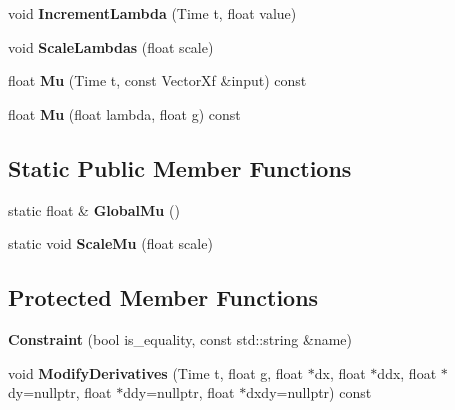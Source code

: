 \begin{DoxyCompactItemize}
\item 
void {\bfseries Increment\+Lambda} (Time t, float value)\hypertarget{classilqgames_1_1_constraint_a41450a7d296c8e31857e44d056e1b9ab}{}\label{classilqgames_1_1_constraint_a41450a7d296c8e31857e44d056e1b9ab}

\item 
void {\bfseries Scale\+Lambdas} (float scale)\hypertarget{classilqgames_1_1_constraint_a8b708fd62f64cd72828d0536d9ad7671}{}\label{classilqgames_1_1_constraint_a8b708fd62f64cd72828d0536d9ad7671}

\item 
float {\bfseries Mu} (Time t, const Vector\+Xf \&input) const \hypertarget{classilqgames_1_1_constraint_a703d0ccdeb1157adc9a681bf7857b9dc}{}\label{classilqgames_1_1_constraint_a703d0ccdeb1157adc9a681bf7857b9dc}

\item 
float {\bfseries Mu} (float lambda, float g) const \hypertarget{classilqgames_1_1_constraint_a6280ae8452b7ff990843d81bed470016}{}\label{classilqgames_1_1_constraint_a6280ae8452b7ff990843d81bed470016}

\end{DoxyCompactItemize}
\subsection*{Static Public Member Functions}
\begin{DoxyCompactItemize}
\item 
static float \& {\bfseries Global\+Mu} ()\hypertarget{classilqgames_1_1_constraint_ab8d5b4e624d92938469cf219ea42293d}{}\label{classilqgames_1_1_constraint_ab8d5b4e624d92938469cf219ea42293d}

\item 
static void {\bfseries Scale\+Mu} (float scale)\hypertarget{classilqgames_1_1_constraint_a131ca1c98e53240d06dcf9e405d8c885}{}\label{classilqgames_1_1_constraint_a131ca1c98e53240d06dcf9e405d8c885}

\end{DoxyCompactItemize}
\subsection*{Protected Member Functions}
\begin{DoxyCompactItemize}
\item 
{\bfseries Constraint} (bool is\+\_\+equality, const std\+::string \&name)\hypertarget{classilqgames_1_1_constraint_acf86b4a9aab163591e785f90b3263fe3}{}\label{classilqgames_1_1_constraint_acf86b4a9aab163591e785f90b3263fe3}

\item 
void {\bfseries Modify\+Derivatives} (Time t, float g, float $\ast$dx, float $\ast$ddx, float $\ast$dy=nullptr, float $\ast$ddy=nullptr, float $\ast$dxdy=nullptr) const \hypertarget{classilqgames_1_1_constraint_a2eae3f666687733f58ccd8338089df14}{}\label{classilqgames_1_1_constraint_a2eae3f666687733f58ccd8338089df14}

\end{DoxyCompactItemize}
